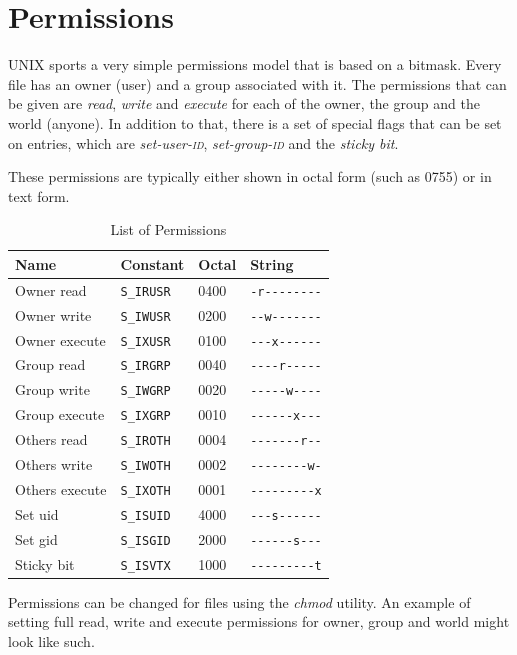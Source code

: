 \documentclass[a4paper]{article}
\begin{document}
\section{Permissions}\label{sec:permissions}

UNIX sports a very simple permissions model that is based on a bitmask. Every file has an owner (user) and a group associated with it. The permissions that can be given are \emph{read}, \emph{write} and \emph{execute} for each of the owner, the group and the world (anyone). In addition to that, there is a set of special flags that can be set on entries, which are \emph{set-user-\textsc{id}}, \emph{set-group-\textsc{id}} and the \emph{sticky bit}.

These permissions are typically either shown in octal form (such as 0755) or in text form.

\begin{table}[!h]
\centering\caption{List of Permissions}
\begin{tabular}{@{}llll@{}}
\toprule
\textbf{Name} & Constant & \textbf{Octal} & \textbf{String}\\
\midrule
Owner read    & \verb|S_IRUSR| & 0400 & \verb|-r--------|\\
Owner write   & \verb|S_IWUSR| & 0200 & \verb|--w-------|\\
Owner execute & \verb|S_IXUSR| & 0100 & \verb|---x------|\\
\midrule
Group read    & \verb|S_IRGRP| & 0040 & \verb|----r-----|\\
Group write   & \verb|S_IWGRP| & 0020 & \verb|-----w----|\\
Group execute & \verb|S_IXGRP| & 0010 & \verb|------x---|\\
\midrule
Others read   & \verb|S_IROTH| & 0004 & \verb|-------r--|\\
Others write  & \verb|S_IWOTH| & 0002 & \verb|--------w-|\\
Others execute& \verb|S_IXOTH| & 0001 & \verb|---------x|\\
\midrule
Set \gls{uid} & \verb|S_ISUID| & 4000 & \verb|---s------|\\
Set \gls{gid} & \verb|S_ISGID| & 2000 & \verb|------s---|\\
Sticky bit    & \verb|S_ISVTX| & 1000 & \verb|---------t|\\
\bottomrule  
\end{tabular}
\end{table}
Permissions can be changed for files using the \emph{chmod} utility. An example of setting full read, write and execute permissions for owner, group and world might look like such.
\end{document}
